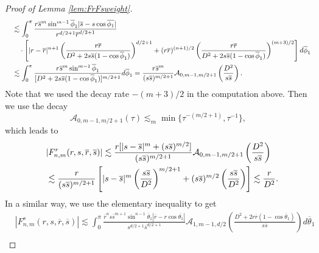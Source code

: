\documentclass[11pt]{amsart}
\theoremstyle{definition}
\theoremstyle{remark}
\numberwithin{equation}{section}
\numberwithin{equation}{section}
\newcommand{\br}[1]{\overline{#1}}
\newcommand{\0}{\emptyset}
\newcommand{\tht}{\theta}
\newcommand{\calA}{\mathcal A}
\begin{document}
\begin{proof}[Proof of Lemma \ref{lem:FrFsweight}]
\begin{equation}
\begin{aligned}
				\;&\lesssim %
				\int_{0}^{\pi}\frac{r\br{s}^{m}\sin^{m-1}\br{\phi}_{1}|\br{s}-s\cos\br{\phi_{1}}|}{r^{d/2+1}\br{r}^{d/2+1}}\\
				&\quad\cdot\left[|r-\br{r}|^{n+1}\left( \frac{r\br{r}}{D^{2}+2s\br{s}(1-\cos\br{\phi}_{1})}\right)^{d/2+1}+(r\br{r})^{(n+1)/2} \left( \frac{r\br{r}}{D^{2}+2s\br{s}(1-\cos\br{\phi}_{1})}\right)^{(m+3)/2}\right]d\br{\phi}_{1}\\
				\quad&\lesssim \int_{0}^{\pi}\frac{%
					r\br{s}^{m}\sin^{m-1}\br{\phi}_{1}}{[D^{2}+2s\br{s}(1-\cos\br{\phi}_{1})]^{m/2+1}}d\br{\phi}_{1}=\frac{r\br{s}^{m}}{(s\br{s})^{m/2+1}}\calA_{0,m-1,m/2+1}\left(\frac{D^{2}}{s\br{s}}\right).
			\end{aligned}
		\end{equation}
		Note that we used the decay rate $-(m+3)/2$ in the computation above. 
		Then we use the decay
		\begin{equation}
			\calA_{0,m-1,m/2+1}(\tau)\lesssim_{m} \min\{ \tau^{-(m/2+1)},\tau^{-1}\},
		\end{equation}
		which leads to
		\begin{equation}
			\begin{aligned}
				&|F_{n,m}^{r}(r,s,\br{r},\br{s})|\lesssim %
				\frac{r[|s-\br{s}|^{m}+(s\br{s})^{m/2}]}{(s\br{s})^{m/2+1}}\calA_{0,m-1,m/2+1}\left(\frac{D^{2}}{s\br{s}}\right)%
				\\
				\quad&\lesssim \frac{%
					r}{(s\br{s})^{m/2+1}}\left[|s-\br{s}|^{m}\left(\frac{s\br{s}}{D^{2}}\right)^{m/2+1}+(s\br{s})^{m/2}\left(\frac{s\br{s}}{D^{2}}\right)\right]\lesssim \frac{r%
				}{D^{2}}.
			\end{aligned}
		\end{equation}
		In a similar way, we use the elementary inequality to get
		\begin{equation}
			\begin{aligned}
				&|F_{n,m}^{s}(r,s,\br{r},\br{s})|\lesssim %
				\int_{0}^{\pi}\frac{\br{r}^{n}s\br{s}^{m+1}\sin^{n-1}\br{\tht}_{1}|\br{r}-r\cos\br{\tht_{1}}|}{s^{d/2+1}\br{s}^{d/2+1}}\calA_{1,m-1,d/2}\left(\frac{D^{2}+2r\br{r}(1-\cos\br{\tht}_{1})}{s\br{s}}\right)d\br{\tht}_{1}\\

\end{aligned}
\end{equation}
\end{proof}
\end{document}
